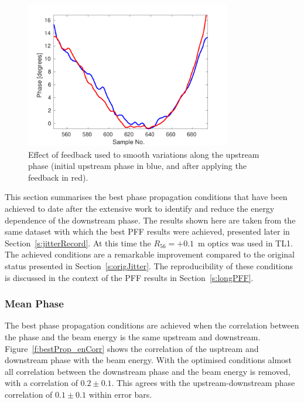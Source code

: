 \begin{figure}
  \centering
  \includegraphics[width=0.8\textwidth]{Figures/propagation/beforeAfterDavideFlatten}
  \caption{Effect of feedback used to smooth variations along the upstream phase (initial upstream phase in blue, and after applying the feedback in red).}
  \label{f:beforeAfterDavideFlatten}
\end{figure}



This section summarises the best phase propagation conditions that have been achieved to date after the extensive work to identify and reduce the energy dependence of the downstream phase. The results shown here are taken from the same dataset with which the best PFF results were achieved, presented later in Section~\ref{s:jitterRecord}. At this time the \(R_{56} = +0.1\)~m optics was used in TL1. The achieved conditions are a remarkable improvement compared to the original status presented in Section~\ref{s:origJitter}. The reproducibility of these conditions is discussed in the context of the PFF results in Section~\ref{s:longPFF}.

\subsubsection{Mean Phase}

The best phase propagation conditions are achieved when the correlation between the phase and the beam energy is the same upstream and downstream. Figure~\ref{f:bestProp_enCorr} shows the correlation of the usptream and downstream phase with the beam energy. With the optimised conditions almost all correlation between the downstream phase and the beam energy is removed, with a correlation of \(0.2\pm0.1\). This agrees with the upstream-downstream phase correlation of \(0.1\pm0.1\) within error bars.

